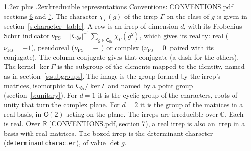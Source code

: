 \documentclass[10pt,a4paper]{article}
\makeatletter
\renewcommand\section{\@startsection{section}{1}{\z@}{-3ex plus -1ex minus -.2ex}%
  {1.2ex plus .2ex}{\normalfont\large\sffamily\bfseries\color{parttitle}}}
\numberwithin{equation}{section}
\newcommand{\grp}[1]{\mathsf{#1}}
\newcommand{\irchar}[1]{\chi_{#1}}
\newcommand{\fsind}{\nu_{\mathrm{FS}}}
\makeatother
\begin{document}
\section{Irreducible representations}\label{s:irreps}
Conventions: \href{../../CONVENTIONS.pdf}{CONVENTIONS.pdf}, sections \href{../../CONVENTIONS.pdf\#conv.6}{6} and \href{../../CONVENTIONS.pdf\#conv.7}{7}.
\leavevmode\label{n:function.character}\label{n:irrep.Gamma}The character $\irchar{\Gamma}(g)$ of the irrep $\Gamma$ on the class of $g$ is given in section~\ref{s:character_table}.
\leavevmode\label{n:index.dimension}\label{n:index.frobenius}\label{n:head.irrep}\label{n:head.reality}A row is an irrep of dimension $d$, with its Frobenius--Schur indicator $\fsind = |\grp{C_{8v}}|^{-1}\allowbreak\sum_{g\in\grp{C_{8v}}}\irchar{\Gamma}(g^2)$, which gives its reality: real ($\fsind = +1$), pseudoreal ($\fsind = -1$) or complex ($\fsind = 0$, paired with its conjugate). \label{n:head.conjugate}The column conjugate gives that conjugate (a dash for the others). \label{n:head.kernel}The kernel $\ker\Gamma$ is the subgroup of the elements mapped to the identity, named as in section~\ref{s:subgroups}. \label{n:head.image}The image is the group formed by the irrep's matrices, isomorphic to $\grp{C_{8v}}/\ker\Gamma$ and named by a point group (section~\ref{s:unitary}). For $d = 1$ it is the cyclic group of the characters, roots of unity that turn the complex plane. For $d = 2$ it is the group of the matrices in a real basis, in $\grp{O(2)}$ acting on the plane. The irreps are irreducible over $\mathbb{C}$. Each is real. Over $\mathbb{R}$ (\href{../../CONVENTIONS.pdf}{CONVENTIONS.pdf}, section \href{../../CONVENTIONS.pdf\#conv.7}{7}), a real irrep is also an irrep in a basis with real matrices. \label{n:mark.determinant}The boxed irrep is the determinant character (\texttt{determinantcharacter}), of value $\det g$.
\setlength{\emergencystretch}{2em}\par\setlength{\emergencystretch}{0pt}
\end{document}
